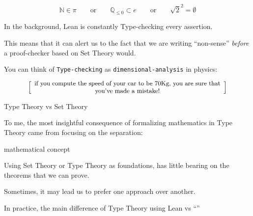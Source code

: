 \documentclass{beamer}
\begin{document}
\begin{frame}[fragile]

$$
  \mathbb{N} \in \pi
  \qquad {\textrm{or}} \qquad
  \mathbb{Q}_{\le 0} \subset e
  \qquad {\textrm{or}} \qquad
  \sqrt{2} ^ 2 = \emptyset
$$
\bigskip

In the background, Lean is constantly Type-checking every assertion.
\bigskip

This means that it can alert us to the fact that we are writing ``non-sense'' {\emph{before}} a proof-checker based on Set Theory would.
\bigskip

You can think of {\color{violet}\verb`Type-checking`} as {\color{violet}\verb`dimensional-analysis`} in physics:

\smallskip
\[
  \left[ \;
  \parbox{0.8\textwidth}{\centering\small
  if you compute the speed of your car to be $70$Kg, you are sure that you've made a mistake!
  }
  \; \right]
\]
\bigskip
\end{frame}

\begin{frame}[fragile]{Type Theory vs Set Theory}

To me, the most insightful consequence of formalizing mathematics in Type Theory came from focusing on the separation:

 mathematical concept
\end{frame}

\begin{frame}[fragile]

Using Set Theory or Type Theory as foundations, has little bearing on the theorems that we can prove.

Sometimes, it may lead us to prefer one approach over another.

In practice, the main difference of Type Theory using Lean vs ``''
\end{frame}

\begin{frame}[fragile]
\end{frame}
\end{document}
